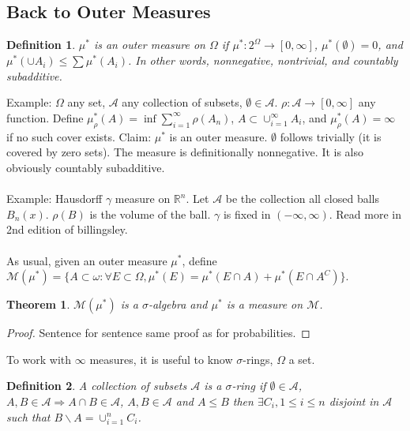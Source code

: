 \documentclass[12pt]{article}
\newtheorem{theorem}{Theorem}
\newtheorem{defn}{Definition}
\begin{document}
\subsection{Back to Outer Measures}
\begin{defn}
$\mu^*$ is an outer measure on $\Omega$ if $\mu^* : 2^\Omega \rightarrow [0, \infty]$, $\mu^*(\emptyset) = 0$, and $\mu^*(\cup A_i) \le \sum \mu^*(A_i)$.  In other words, nonnegative, nontrivial, and countably subadditive.
\end{defn}

Example: $\Omega$ any set, $\mathcal{A}$ any collection of subsets, $\emptyset \in \mathcal{A}$.  $\rho : \mathcal{A} \rightarrow [0, \infty]$ any function.  Define $\mu_\rho^* (A) = \inf \sum_{i=1}^\infty \rho(A_n)$, $A \subset \cup_{i=1}^\infty A_i$, and $\mu_\rho^*(A) = \infty$ if no such cover exists.  Claim: $\mu^*$ is an outer measure.  $\emptyset$ follows trivially (it is covered by zero sets).  The measure is definitionally nonnegative.  It is also obviously countably subadditive.
\\ \\
Example: Hausdorff $\gamma$ measure on $\mathbb{R}^n$.  Let $\mathcal{A}$ be the collection all closed balls $B_n(x)$. $\rho(B)$ is the volume of the ball.  $\gamma$ is fixed in $(-\infty, \infty)$.  Read more in 2nd edition of billingsley.
\\ \\
As usual, given an outer measure $\mu^*$, define $\mathcal{M}(\mu^*) = \{ A \subset \omega: \forall E \subset \Omega, \mu^*(E) = \mu^*(E \cap A) + \mu^*(E \cap A^C) \}$.
\begin{theorem}
$\mathcal{M}(\mu^*)$ is a $\sigma$-algebra and $\mu^*$ is a measure on $\mathcal{M}$.
\end{theorem}
\begin{proof}
Sentence for sentence same proof as for probabilities.
\end{proof}
To work with $\infty$ measures, it is useful to know $\sigma$-rings, $\Omega$ a set.

\begin{defn}
A collection of subsets $\mathcal{A}$ is a $\sigma$-ring if $\emptyset \in \mathcal{A}$, $A,B \in \mathcal{A} \Rightarrow A \cap B \in \mathcal{A}$, $A, B \in \mathcal{A}$ and $A \le B$ then $\exists C_i, 1 \le i \le n$ disjoint in $\mathcal{A}$ such that $B \backslash A = \cup_{i=1}^n C_i$.
\end{defn}
\end{document}
